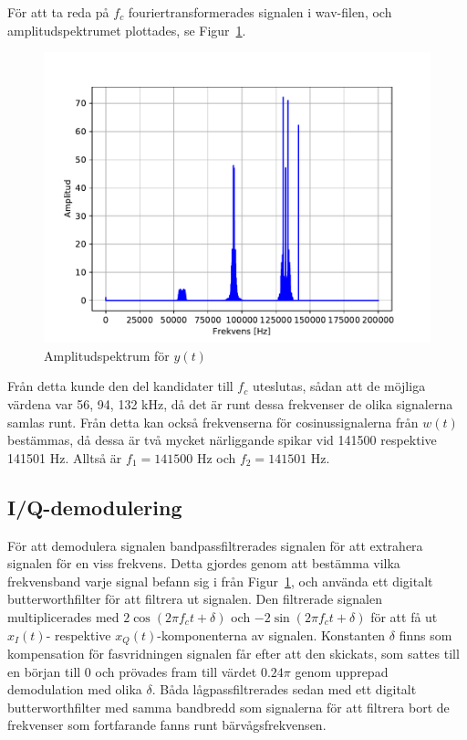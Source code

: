 \documentclass[10pt,twocolumn]{article}
\begin{document}
För att ta reda på $f_c$ fouriertransformerades signalen i wav-filen, och
amplitudspektrumet plottades, se Figur~\ref{fig:yamp}. 
\begin{figure}[h]
    \centering
    \includegraphics[width=0.8\linewidth]{figures/yamp.pdf}
    \caption{Amplitudspektrum för $y(t)$}
    \label{fig:yamp}
\end{figure}
Från detta kunde den del kandidater till $f_c$ uteslutas, sådan att
de möjliga värdena var 56, 94, 132 kHz, då det är runt dessa frekvenser de
olika signalerna samlas runt. Från detta kan också frekvenserna för
cosinussignalerna från $w(t)$
bestämmas, då dessa är två mycket närliggande spikar vid 141500 respektive
141501 Hz. Alltså är $f_1=141500$ Hz och $f_2=141501$ Hz.

\subsection{I/Q-demodulering\label{sub:iq}}
För att demodulera signalen bandpassfiltrerades signalen för att extrahera
signalen för en viss frekvens. Detta gjordes genom att bestämma vilka
frekvensband varje signal befann sig i från Figur~\ref{fig:yamp}, och använda
ett digitalt butterworthfilter för att filtrera ut signalen. Den filtrerade
signalen multiplicerades med $2\cos(2\pi f_c t + \delta)$ och 
$-2\sin(2\pi f_c t + \delta)$ 
för att få ut $x_I(t)$- respektive $x_Q(t)$-komponenterna av signalen.
Konstanten $\delta$ finns som kompensation för fasvridningen signalen får efter
att den skickats, som sattes till en början till 0 och prövades fram till
värdet $0.24\pi$ genom upprepad demodulation med olika $\delta$. Båda
lågpassfiltrerades sedan med ett digitalt butterworthfilter med samma bandbredd
som signalerna för att filtrera
bort de frekvenser som fortfarande fanns runt bärvågsfrekvensen.
\end{document}
